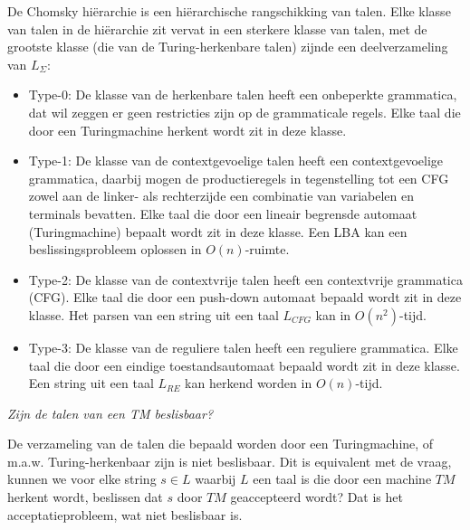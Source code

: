 De Chomsky hi\"erarchie is een hi\"erarchische rangschikking van talen. Elke klasse van talen in de hi\"erarchie zit vervat in een sterkere klasse van talen, met de grootste klasse (die van de Turing-herkenbare talen) zijnde een deelverzameling van $L_\Sigma$:
\begin{itemize}
\item Type-0: De klasse van de herkenbare talen heeft een onbeperkte grammatica, dat wil zeggen er geen restricties zijn op de grammaticale regels. Elke taal die door een Turingmachine herkent wordt zit in deze klasse.
\item Type-1: De klasse van de contextgevoelige talen heeft een contextgevoelige grammatica, daarbij mogen de productieregels in tegenstelling tot een CFG zowel aan de linker- als rechterzijde een combinatie van variabelen en terminals bevatten. Elke taal die door een lineair begrensde automaat (Turingmachine) bepaalt wordt zit in deze klasse. Een LBA kan een beslissingsprobleem oplossen in $O(n)$-ruimte.
\item Type-2: De klasse van de contextvrije talen heeft een contextvrije grammatica (CFG). Elke taal die door een push-down automaat bepaald wordt zit in deze klasse. Het parsen van een string uit een taal $L_{CFG}$ kan in $O(n^2)$-tijd.
\item Type-3: De klasse van de reguliere talen heeft een reguliere grammatica. Elke taal die door een eindige toestandsautomaat bepaald wordt zit in deze klasse. Een string uit een taal $L_{RE}$ kan herkend worden in $O(n)$-tijd.
\end{itemize}
\begin{center}
\end{center}

\textit{Zijn de talen van een TM beslisbaar?}

De verzameling van de talen die bepaald worden door een Turingmachine, of m.a.w. Turing-herkenbaar zijn is niet beslisbaar. Dit is equivalent met de vraag, kunnen we voor elke string $s \in L$ waarbij $L$ een taal is die door een machine $TM$ herkent wordt, beslissen dat $s$ door $TM$ geaccepteerd wordt? Dat is het acceptatieprobleem, wat niet beslisbaar is.

